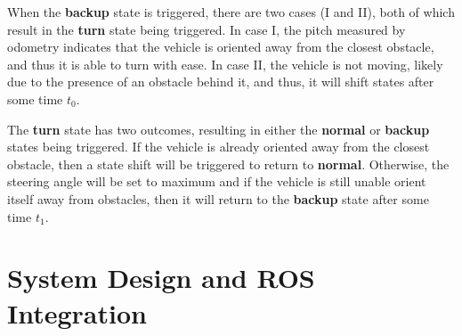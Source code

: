 \documentclass[conference]{IEEEtran}
\begin{document}


When the \textbf{backup} state is triggered, there are two cases (I and II), both of which result in the \textbf{turn} state being triggered. In case I, the pitch measured by odometry indicates that the vehicle is oriented away from the closest obstacle, and thus it is able to turn with ease. In case II, the vehicle is not moving, likely due to the presence of an obstacle behind it, and thus, it will shift states after some time $t_0$. 

The \textbf{turn} state has two outcomes, resulting in either the \textbf{normal} or \textbf{backup} states being triggered. If the vehicle is already oriented away from the closest obstacle, then a state shift will be triggered to return to \textbf{normal}. Otherwise, the steering angle will be set to maximum and if the vehicle is still unable orient itself away from obstacles, then it will return to the \textbf{backup} state after some time $t_1$.

\section{System Design and ROS Integration}




\end{document}
